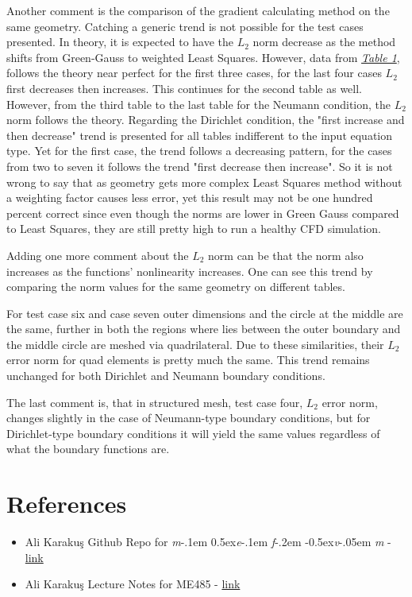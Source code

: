 \documentclass[a4paper, 12pt]{article}
\newcommand\mefvm{%
    \textit{m}\kern-.1em%
    \raise0.5ex\hbox{\textit{e}}\kern-.1em%
    \textit{f}\kern-.2em%
    \raise-0.5ex\hbox{\textit{v}}\kern-.05em%
    \textit{m}
}
\begin{document}
Another comment is the comparison of the gradient calculating method on the same geometry. Catching a generic trend is not possible for the test cases presented. In theory, it is expected to have the $L_2$ norm decrease as the method shifts from Green-Gauss to weighted Least Squares. However, data from \hyperref[T1]{\textit{Table 1}}, follows the theory near perfect for the first three cases, for the last four cases $L_2$ first decreases then increases. This continues for the second table as well. However, from the third table to the last table for the Neumann condition, the $L_2$ norm follows the theory. Regarding the Dirichlet condition, the "first increase and then decrease" trend is presented for all tables indifferent to the input equation type. Yet for the first case, the trend follows a decreasing pattern, for the cases from two to seven it follows the trend "first decrease then increase". So it is not wrong to say that as geometry gets more complex Least Squares method without a weighting factor causes less error, yet this result may not be one hundred percent correct since even though the norms are lower in Green Gauss compared to Least Squares, they are still pretty high to run a healthy CFD simulation. \\\par
Adding one more comment about the $L_2$ norm can be that the norm also increases as the functions' nonlinearity increases. One can see this trend by comparing the norm values for the same geometry on different tables.\\\par
For test case six and case seven outer dimensions and the circle at the middle are the same, further in both the regions where lies between the outer boundary and the middle circle are meshed via quadrilateral. Due to these similarities, their $L_2$ error norm for quad elements is pretty much the same. This trend remains unchanged for both Dirichlet and Neumann boundary conditions.\\\par
The last comment is, that in structured mesh, test case four, $L_2$ error norm, changes slightly in the case of Neumann-type boundary conditions, but for Dirichlet-type boundary conditions it will yield the same values regardless of what the boundary functions are.

\newpage
\section{References}
\begin{itemize}
    \item Ali Karakuş Github Repo for \mefvm - \textcolor{blue}{\href{https://github.com/AliKarakus/me485-HWs/tree/HW1}{link}}
    \item Ali Karakuş Lecture Notes for ME485 - \textcolor{blue}{\href{https://odtuclass2024f.metu.edu.tr/course/view.php?id=2835}{link}}
\end{itemize}
\end{document}
